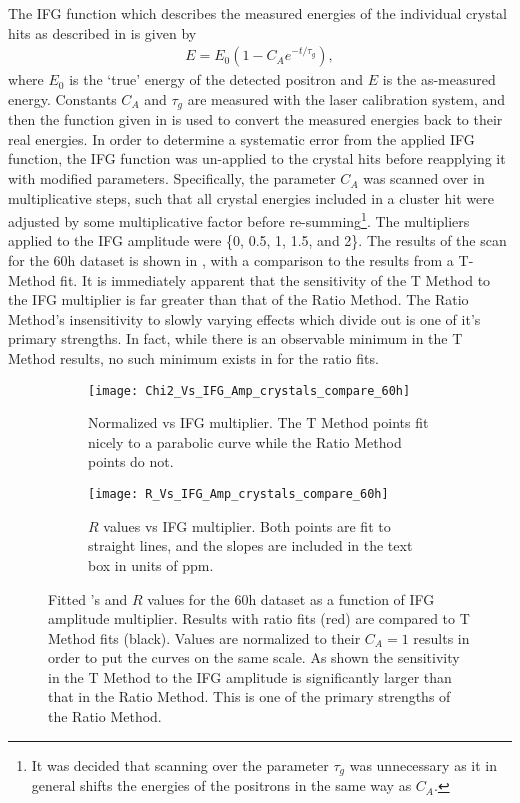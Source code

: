 The IFG function which describes the measured energies of the individual crystal hits as described in  is given by \cite{IFG}
    \begin{align} \label{eq:IFG}
        E = E_{0}(1 - C_{A} e^{-t/\tau_{g}}),
    \end{align}
where $E_{0}$ is the `true' energy of the detected positron and $E$ is the as-measured energy. Constants $C_{A}$ and $\tau_{g}$ are measured with the laser calibration system, and then the function given in  is used to convert the measured energies back to their real energies. In order to determine a systematic error from the applied IFG function, the IFG function was un-applied to the crystal hits before reapplying it with modified parameters. Specifically, the parameter $C_{A}$ was scanned over in multiplicative steps, such that all crystal energies included in a cluster hit were adjusted by some multiplicative factor before re-summing\footnote{It was decided that scanning over the parameter $\tau_{g}$ was unnecessary as it in general shifts the energies of the positrons in the same way as $C_{A}$.}. The multipliers applied to the IFG amplitude were \{0, 0.5, 1, 1.5, and 2\}. The results of the scan for the 60h dataset is shown in , with a comparison to the results from a T-Method fit. It is immediately apparent that the sensitivity of the T Method to the IFG multiplier is far greater than that of the Ratio Method. The Ratio Method's insensitivity to slowly varying effects which divide out is one of it's primary strengths. In fact, while there is an observable minimum in the T Method \chisq results, no such minimum exists in for the ratio fits.  


\begin{figure}[]
\centering
    \begin{subfigure}[]{0.45\textwidth}
        \centering
        \texttt{[image: Chi2\_Vs\_IFG\_Amp\_crystals\_compare\_60h]}
        \caption{Normalized \chisq vs IFG multiplier. The T Method points fit nicely to a parabolic curve while the Ratio Method points do not.}
    \end{subfigure}%
    \hspace{4mm}
    \begin{subfigure}[]{0.45\textwidth}
        \centering
        \texttt{[image: R\_Vs\_IFG\_Amp\_crystals\_compare\_60h]}
        \caption{$R$ values vs IFG multiplier. Both points are fit to straight lines, and the slopes are included in the text box in units of ppm.}
    \end{subfigure}
\caption[]{Fitted \chisq's and $R$ values for the 60h dataset as a function of IFG amplitude multiplier. Results with ratio fits (red) are compared to T Method fits (black). Values are normalized to their $C_{A} = 1$ results in order to put the curves on the same scale. As shown the sensitivity in the T Method to the IFG amplitude is significantly larger than that in the Ratio Method. This is one of the primary strengths of the Ratio Method.}
\label{fig:IFG_amplitude}
\end{figure}


